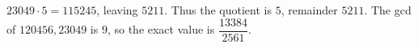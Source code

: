$23049\cdot5=115245$, leaving $5211$. Thus the quotient is $5$, remainder $5211$. The gcd of $120456,23049$ is $9$, so the exact value is $\boxed{\dfrac{13384}{2561}}$.
